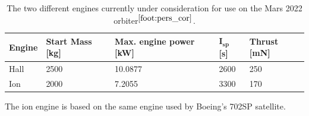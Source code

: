 \begin{table}[!ht]
\begin{center}
\caption{The two different engines currently under consideration for use on the Mars 2022 orbiter$^{\ref{foot:pers_cor}}$.}
\label{tab:orb_char}
\begin{tabular}{|l|l|l|l|l|}
\hline 
\textbf{Engine} & \textbf{Start Mass [kg]}  & \textbf{Max. engine power [kW]} & $\mathbf{I_{sp}}$ \textbf{[s]} & \textbf{Thrust [mN]}  \\ \hline \hline
Hall & 2500 & 10.0877 & 2600 & 250 \\ \hline
Ion & 2000 & 7.2055 & 3300 & 170 \\ \hline

\end{tabular}
\end{center}
\end{table}

The ion engine is based on the same engine used by Boeing's 702SP satellite. 


